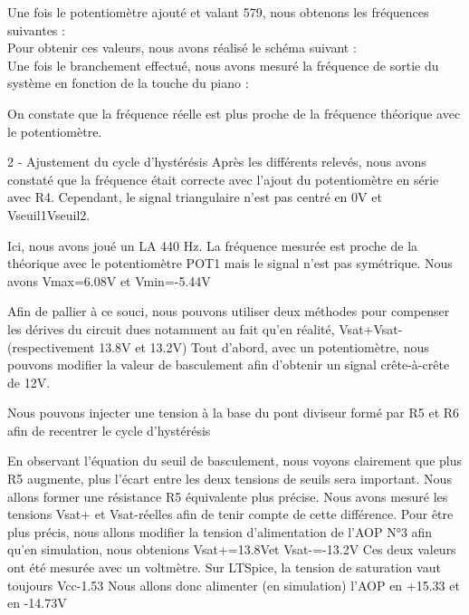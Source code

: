 {Une fois le potentiomètre ajouté et valant 579, nous obtenons les fréquences suivantes :\\

Pour obtenir ces valeurs, nous avons réalisé le schéma suivant :\\

Une fois le branchement effectué, nous avons mesuré la fréquence de sortie du système en fonction de la touche du piano :

On constate que la fréquence réelle est plus proche de la fréquence théorique avec le potentiomètre.













2 - Ajustement du cycle d’hystérésis
Après les différents relevés, nous avons constaté que la fréquence était correcte avec l’ajout du potentiomètre en série avec R4. Cependant, le signal triangulaire n’est pas centré en 0V 
et Vseuil1Vseuil2.


Ici, nous avons joué un LA 440 Hz. La fréquence mesurée est proche de la théorique avec le potentiomètre POT1 mais le signal n’est pas symétrique. Nous avons 
Vmax=6.08V et
Vmin=-5.44V











Afin de pallier à ce souci, nous pouvons utiliser deux méthodes pour compenser les dérives du circuit dues notamment au fait qu’en réalité, Vsat+Vsat- (respectivement 13.8V et 13.2V)
Tout d’abord, avec un potentiomètre, nous pouvons modifier la valeur de basculement afin d’obtenir un signal crête-à-crête de 12V.

Nous pouvons injecter une tension à la base du pont diviseur formé par R5 et R6 afin de recentrer le cycle d’hystérésis

En observant l’équation du seuil de basculement, nous voyons clairement que plus R5 augmente, plus l'écart entre les deux tensions de seuils sera important.
Nous allons former une résistance R5 équivalente plus précise.
Nous avons mesuré les tensions Vsat+ et Vsat-réelles afin de tenir compte de cette différence. 
Pour être plus précis, nous allons modifier la tension d’alimentation de l’AOP N°3 afin qu’en simulation, nous obtenions Vsat+=13.8Vet Vsat-=-13.2V
Ces deux valeurs ont été mesurée avec un voltmètre.
Sur LTSpice, la tension de saturation vaut toujours Vcc-1.53
Nous allons donc alimenter (en simulation) l’AOP en +15.33 et en -14.73V

}
